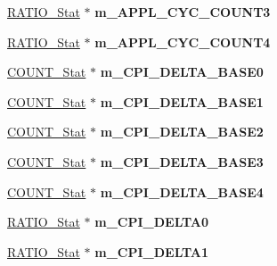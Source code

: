 \begin{DoxyCompactItemize}
\item 
\hypertarget{classall__stats__c_a8b507538e1a1f2a25abe9a96f26029a4}{
\hyperlink{classRATIO__Stat}{RATIO\_\-Stat} $\ast$ {\bfseries m\_\-APPL\_\-CYC\_\-COUNT3}}
\label{classall__stats__c_a8b507538e1a1f2a25abe9a96f26029a4}

\item 
\hypertarget{classall__stats__c_aa08c177aca6e7bc8f489b2053f9ceb18}{
\hyperlink{classRATIO__Stat}{RATIO\_\-Stat} $\ast$ {\bfseries m\_\-APPL\_\-CYC\_\-COUNT4}}
\label{classall__stats__c_aa08c177aca6e7bc8f489b2053f9ceb18}

\item 
\hypertarget{classall__stats__c_a70874da77dca37792ed57e0887095a59}{
\hyperlink{classCOUNT__Stat}{COUNT\_\-Stat} $\ast$ {\bfseries m\_\-CPI\_\-DELTA\_\-BASE0}}
\label{classall__stats__c_a70874da77dca37792ed57e0887095a59}

\item 
\hypertarget{classall__stats__c_a9b307aad0be9ae373f4ef54bdc4f6d8a}{
\hyperlink{classCOUNT__Stat}{COUNT\_\-Stat} $\ast$ {\bfseries m\_\-CPI\_\-DELTA\_\-BASE1}}
\label{classall__stats__c_a9b307aad0be9ae373f4ef54bdc4f6d8a}

\item 
\hypertarget{classall__stats__c_a22dc95727f5454cb5414e4fffcbd7fba}{
\hyperlink{classCOUNT__Stat}{COUNT\_\-Stat} $\ast$ {\bfseries m\_\-CPI\_\-DELTA\_\-BASE2}}
\label{classall__stats__c_a22dc95727f5454cb5414e4fffcbd7fba}

\item 
\hypertarget{classall__stats__c_ac5d416bf1c5084cc1a5300d13cca2854}{
\hyperlink{classCOUNT__Stat}{COUNT\_\-Stat} $\ast$ {\bfseries m\_\-CPI\_\-DELTA\_\-BASE3}}
\label{classall__stats__c_ac5d416bf1c5084cc1a5300d13cca2854}

\item 
\hypertarget{classall__stats__c_ad3b64e2a5b6a256f32c06b77ec0688a3}{
\hyperlink{classCOUNT__Stat}{COUNT\_\-Stat} $\ast$ {\bfseries m\_\-CPI\_\-DELTA\_\-BASE4}}
\label{classall__stats__c_ad3b64e2a5b6a256f32c06b77ec0688a3}

\item 
\hypertarget{classall__stats__c_a507b2854f5d4140faceeb796b580f149}{
\hyperlink{classRATIO__Stat}{RATIO\_\-Stat} $\ast$ {\bfseries m\_\-CPI\_\-DELTA0}}
\label{classall__stats__c_a507b2854f5d4140faceeb796b580f149}

\item 
\hypertarget{classall__stats__c_a5614b07e702b4b95f574ff77088c776f}{
\hyperlink{classRATIO__Stat}{RATIO\_\-Stat} $\ast$ {\bfseries m\_\-CPI\_\-DELTA1}}
\label{classall__stats__c_a5614b07e702b4b95f574ff77088c776f}


\end{DoxyCompactItemize}
